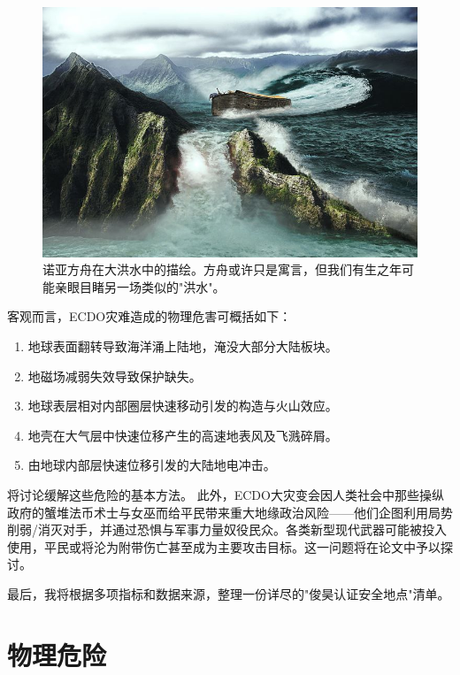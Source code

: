 \documentclass[10pt,twocolumn,letterpaper]{article}
\begin{document}
\begin{figure}[b]
\begin{center}
   \includegraphics[width=1\linewidth]{noah.jpg}
\end{center}
   \caption{诺亚方舟在大洪水中的描绘。方舟或许只是寓言，但我们有生之年可能亲眼目睹另一场类似的"洪水"。 \cite{2}}
\label{fig:1}
\label{fig:onecol}
\end{figure}

客观而言，ECDO灾难造成的物理危害可概括如下：

\begin{flushleft}
\begin{enumerate}
    \item 地球表面翻转导致海洋涌上陆地，淹没大部分大陆板块。
    \item 地磁场减弱失效导致保护缺失。
    \item 地球表层相对内部圈层快速移动引发的构造与火山效应。
    \item 地壳在大气层中快速位移产生的高速地表风及飞溅碎屑。
    \item 由地球内部层快速位移引发的大陆地电冲击。
\end{enumerate}
\end{flushleft}

将讨论缓解这些危险的基本方法。
此外，ECDO大灾变会因人类社会中那些操纵政府的蟹堆法币术士与女巫而给平民带来重大地缘政治风险——他们企图利用局势削弱/消灭对手，并通过恐惧与军事力量奴役民众。各类新型现代武器可能被投入使用，平民或将沦为附带伤亡甚至成为主要攻击目标。这一问题将在论文中予以探讨。

最后，我将根据多项指标和数据来源，整理一份详尽的"俊昊认证安全地点"清单。
\section{物理危险}
\end{document}
